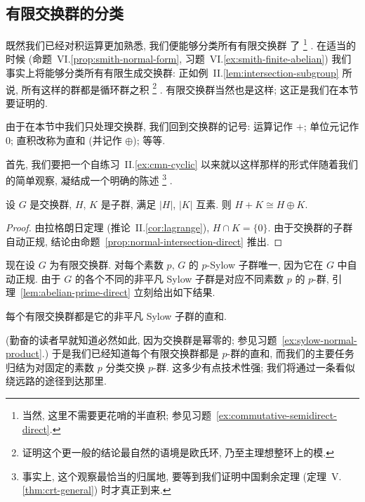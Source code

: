 \subsection{有限交换群的分类}
\label{subsec:classification-fag}

既然我们已经对积运算更加熟悉, 我们便能够分类所有有限交换群%
%
了%
\footnote{当然, 这里不需要更花哨的半直积; 参见习题~\ref{ex:commutative-semidirect-direct}.}%
. 在适当的时候 (命题~VI.\ref{prop:smith-normal-form}, 习题~VI.\ref{ex:smith-finite-abelian}) 我们事实上将能够分类所有有限生成交换群: 正如例~II.\ref{lem:intersection-subgroup} 所说, 所有这样的群都是循环群之积%
\footnote{证明这个更一般的结论最自然的语境是欧氏环, 乃至主理想整环上的模.}%
. 有限交换群当然也是这样; 这正是我们在本节要证明的.

由于在本节中我们只处理交换群, 我们回到交换群的记号: 运算记作 $+$; 单位元记作 $0$; 直积改称为直和%
%
(并记作 $\oplus$); 等等.

首先, 我们要把一个自练习~II.\ref{ex:cmn-cyclic} 以来就以这样那样的形式伴随着我们的简单观察, 凝结成一个明确的陈述%
\footnote{事实上, 这个观察最恰当的归属地, 要等到我们证明中国剩余定理 (定理~V.\ref{thm:crt-general}) 时才真正到来.}%
.

\begin{lemma}
\label{lem:abelian-prime-direct}
设 $G$ 是交换群, $H$, $K$ 是子群, 满足 $|H|$, $|K|$ 互素. 则 $H + K \cong H \oplus K$.
\end{lemma}

\begin{proof}
由拉格朗日定理 (推论~II.\ref{cor:lagrange}), $H \cap K = \{0\}$. 由于交换群的子群自动正规, 结论由命题~\ref{prop:normal-intersection-direct} 推出.
\end{proof}

现在设 $G$ 为有限交换群. 对每个素数 $p$, $G$ 的 $p$-Sylow 子群唯一, 因为它在 $G$ 中自动正规. 由于 $G$ 的各个不同的非平凡 Sylow 子群是对应不同素数 $p$ 的 $p$-群, 引理~\ref{lem:abelian-prime-direct} 立刻给出如下结果.

\begin{corollary}
\label{cor:abelian-sylow-direct}
每个有限交换群都是它的非平凡 Sylow 子群的直和.
\end{corollary}

(勤奋的读者早就知道必然如此, 因为交换群是幂零的; 参见习题~\ref{ex:sylow-normal-product}.) 于是我们已经知道每个有限交换群都是 $p$-群的直和, 而我们的主要任务归结为对固定的素数 $p$ 分类交换 $p$-群. 这多少有点技术性强; 我们将通过一条看似绕远路的途径到达那里.

